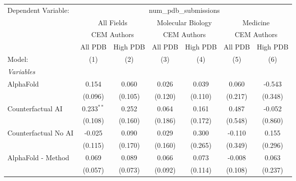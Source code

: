 \begingroup
\centering
\begin{tabular}{lcccccc}
   \tabularnewline \midrule \midrule
   Dependent Variable: & \multicolumn{6}{c}{num\_pdb\_submissions}\\
 & \multicolumn{2}{c}{All Fields} & \multicolumn{2}{c}{Molecular Biology} & \multicolumn{2}{c}{Medicine} \\
\cmidrule(lr){2-3} \cmidrule(lr){4-5} \cmidrule(lr){6-7}
 & \multicolumn{2}{c}{CEM Authors} & \multicolumn{2}{c}{CEM Authors} & \multicolumn{2}{c}{CEM Authors} \\
\cmidrule(lr){2-3} \cmidrule(lr){4-5} \cmidrule(lr){6-7}
 & \multicolumn{1}{c}{All PDB} & \multicolumn{1}{c}{High PDB} & \multicolumn{1}{c}{All PDB} & \multicolumn{1}{c}{High PDB} & \multicolumn{1}{c}{All PDB} & \multicolumn{1}{c}{High PDB} \\
\cmidrule(lr){2-2} \cmidrule(lr){3-3} \cmidrule(lr){4-4} \cmidrule(lr){5-5} \cmidrule(lr){6-6} \cmidrule(lr){7-7}
   Model:                                                     & (1)          & (2)     & (3)            & (4)            & (5)          & (6)\\  
   \midrule
   \emph{Variables}\\
   AlphaFold                                                  & 0.154        & 0.060   & 0.026          & 0.039          & 0.060        & -0.543\\   
                                                              & (0.096)      & (0.105) & (0.120)        & (0.110)        & (0.217)      & (0.348)\\   
   Counterfactual AI                                          & 0.233$^{**}$ & 0.252   & 0.064          & 0.161          & 0.487        & -0.052\\   
                                                              & (0.108)      & (0.160) & (0.186)        & (0.172)        & (0.548)      & (0.860)\\   
   Counterfactual No AI                                       & -0.025       & 0.090   & 0.029          & 0.300          & -0.110       & 0.155\\   
                                                              & (0.115)      & (0.170) & (0.160)        & (0.265)        & (0.349)      & (0.296)\\   
   AlphaFold - Method                                         & 0.069        & 0.089   & 0.066          & 0.073          & -0.008       & 0.063\\   
                                                              & (0.057)      & (0.073) & (0.092)        & (0.114)        & (0.108)      & (0.237)\\   

\end{tabular}
